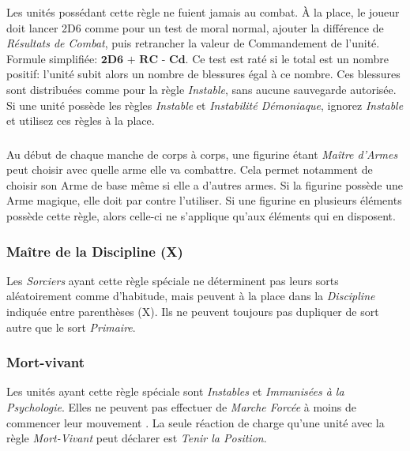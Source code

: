 Les unités possédant cette règle ne fuient jamais au combat. À la place, le joueur doit lancer 2D6 comme pour un test de moral normal, ajouter la différence de \emph{Résultats de Combat}, puis retrancher la valeur de Commandement de l'unité. Formule simplifiée: $\textbf{2D6 + RC - Cd}$. Ce test est raté si le total est un nombre positif: l'unité subit alors un nombre de blessures égal à ce nombre. Ces blessures sont distribuées comme pour la règle \emph{Instable}, sans aucune sauvegarde autorisée. Si une unité possède les règles \emph{Instable} et \emph{Instabilité Démoniaque}, ignorez \emph{Instable} et utilisez ces règles à la place.

\subsubsection*{}

Au début de chaque manche de corps à corps, une figurine étant \emph{Maître d'Armes} peut choisir avec quelle arme elle va combattre. Cela permet notamment de choisir son Arme de base même si elle a d'autres armes. Si la figurine possède une Arme magique, elle doit par contre l'utiliser. Si une figurine en plusieurs éléments possède cette règle, alors celle-ci ne s'applique qu'aux éléments qui en disposent.

\subsubsection*{Maître de la Discipline (X)}

Les \emph{Sorciers} ayant cette règle spéciale ne déterminent pas leurs sorts aléatoirement comme d'habitude, mais peuvent à la place  dans la \emph{Discipline} indiquée entre parenthèses (X). Ils ne peuvent toujours pas dupliquer de sort autre que le sort \emph{Primaire}.

\subsubsection*{Mort-vivant}

Les unités ayant cette règle spéciale sont \emph{Instables} et \emph{Immunisées à la Psychologie}. Elles ne peuvent pas effectuer de \emph{Marche Forcée} à moins de commencer leur mouvement . La seule réaction de charge qu'une unité avec la règle \emph{Mort-Vivant} peut déclarer est \emph{Tenir la Position}.

